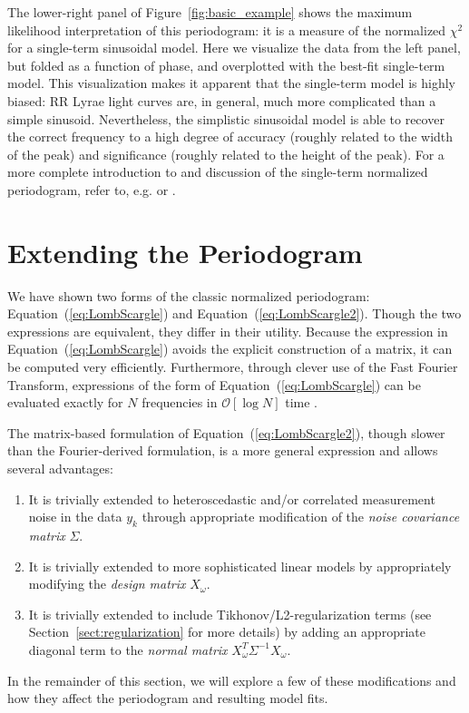 \documentclass{emulateapj}
\newcommand{\Fig}[1]{Figure~\ref{fig:#1}}
\newcommand{\fig}[1]{\Fig{#1}}
\newcommand{\Eq}[1]{Equation~(\ref{eq:#1})}
\newcommand{\eq}[1]{\Eq{#1}}
\newcommand{\Sect}[1]{Section~\ref{sect:#1}}
\newcommand{\sect}[1]{\Sect{#1}}
\newcommand{\sectlabel}[1]{\label{sect:#1}}
\begin{document}
The lower-right panel of \fig{basic_example} shows the maximum likelihood interpretation of this periodogram: it is a measure of the normalized $\chi^2$ for a single-term sinusoidal model. Here we visualize the data from the left panel, but folded as a function of phase, and overplotted with the best-fit single-term model. This visualization makes it apparent that the single-term model is highly biased: RR Lyrae light curves are, in general, much more complicated than a simple sinusoid. Nevertheless, the simplistic sinusoidal model is able to recover the correct frequency to a high degree of accuracy (roughly related to the width of the peak) and significance (roughly related to the height of the peak). For a more complete introduction to and discussion of the single-term normalized periodogram, refer to, e.g. \citet{Bretthorst88} or \citet{ICVG2014}.

\section{Extending the Periodogram}
\sectlabel{extending_periodogram}
We have shown two forms of the classic normalized periodogram: \eq{LombScargle} and \eq{LombScargle2}. Though the two expressions are equivalent, they differ in their utility. Because the expression in \eq{LombScargle} avoids the explicit construction of a matrix, it can be computed very efficiently. Furthermore, through clever use of the Fast Fourier Transform, expressions of the form of \eq{LombScargle} can be evaluated exactly for $N$ frequencies in $\mathcal{O}[\log{N}]$ time \citep{Press89}.

The matrix-based formulation of \eq{LombScargle2}, though slower than the Fourier-derived formulation, is a more general expression and allows several advantages:
\begin{enumerate}
  \item It is trivially extended to heteroscedastic and/or correlated measurement noise in the data $y_k$ through appropriate modification of the {\it noise covariance matrix} $\Sigma$.
  \item It is trivially extended to more sophisticated linear models by appropriately modifying the {\it design matrix} $X_\omega$.
  \item It is trivially extended to include Tikhonov/L2-regularization terms (see \sect{regularization} for more details)  by adding an appropriate diagonal term to the {\it normal matrix} $X_\omega^T\Sigma^{-1}X_\omega$.
\end{enumerate}
In the remainder of this section, we will explore a few of these modifications and how they affect the periodogram and resulting model fits.
\end{document}
